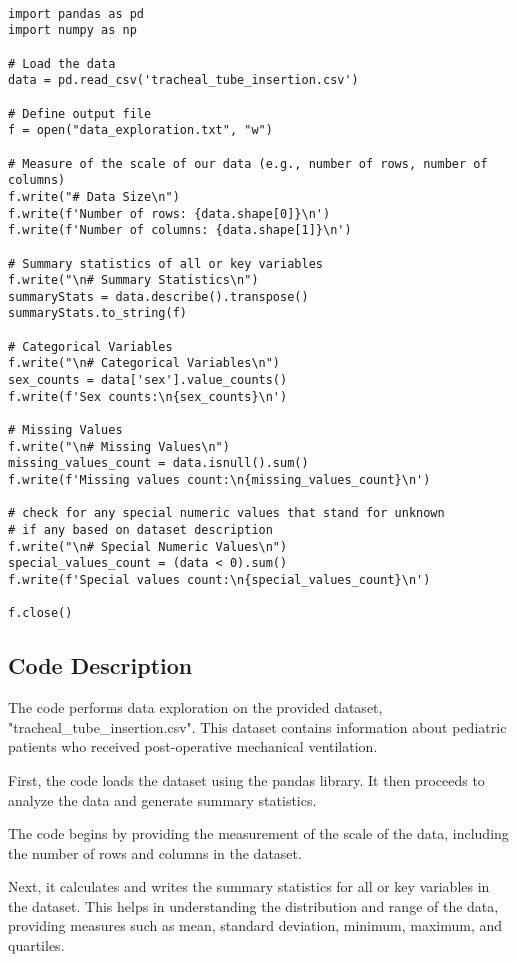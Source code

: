 \documentclass[11pt]{article}
\begin{document}
\begin{verbatim}

import pandas as pd
import numpy as np

# Load the data
data = pd.read_csv('tracheal_tube_insertion.csv')

# Define output file
f = open("data_exploration.txt", "w")

# Measure of the scale of our data (e.g., number of rows, number of columns)
f.write("# Data Size\n")
f.write(f'Number of rows: {data.shape[0]}\n')
f.write(f'Number of columns: {data.shape[1]}\n')

# Summary statistics of all or key variables
f.write("\n# Summary Statistics\n")
summaryStats = data.describe().transpose()
summaryStats.to_string(f)

# Categorical Variables
f.write("\n# Categorical Variables\n")
sex_counts = data['sex'].value_counts()
f.write(f'Sex counts:\n{sex_counts}\n')

# Missing Values
f.write("\n# Missing Values\n")
missing_values_count = data.isnull().sum()
f.write(f'Missing values count:\n{missing_values_count}\n')

# check for any special numeric values that stand for unknown 
# if any based on dataset description
f.write("\n# Special Numeric Values\n")
special_values_count = (data < 0).sum()
f.write(f'Special values count:\n{special_values_count}\n')

f.close()

\end{verbatim}

\subsection{Code Description}

The code performs data exploration on the provided dataset, "tracheal\_tube\_insertion.csv". This dataset contains information about pediatric patients who received post-operative mechanical ventilation.

First, the code loads the dataset using the pandas library. It then proceeds to analyze the data and generate summary statistics.

The code begins by providing the measurement of the scale of the data, including the number of rows and columns in the dataset.

Next, it calculates and writes the summary statistics for all or key variables in the dataset. This helps in understanding the distribution and range of the data, providing measures such as mean, standard deviation, minimum, maximum, and quartiles.
\end{document}
